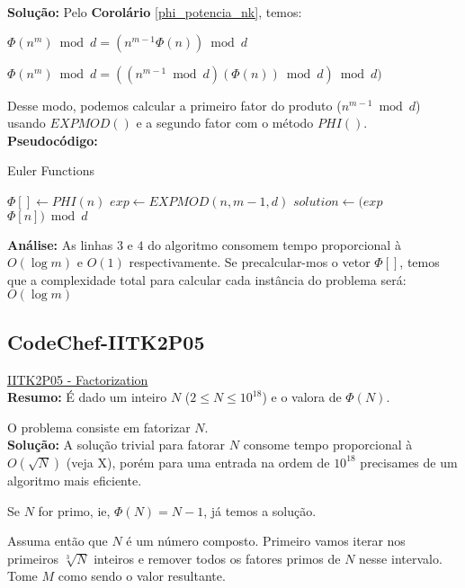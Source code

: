 \textbf{Solução:}
Pelo \textbf{Corolário} \autoref{phi_potencia_nk}, temos: 

$\Phi(n^m) \bmod d = (n^{m-1}\Phi(n)) \bmod d$

$\Phi(n^m) \bmod d = ((n^{m-1} \bmod d)(\Phi(n)) \bmod d) \bmod d)$

Desse modo, podemos calcular a primeiro fator do produto ($n^{m-1} \bmod d$) usando $EXPMOD()$ e a segundo fator com o método $PHI()$.
\\

\textbf{Pseudocódigo:}
\begin{algorithm}
\caption{Euler Functions}
\begin{algorithmic}[1]
\State $\Phi[] \gets PHI(n)$
\State $exp \gets EXPMOD(n, m-1, d)$
\State $solution \gets (exp$ $\Phi[n]) \bmod d$
\State {}
\EndProcedure
\end{algorithmic}
\end{algorithm}

\textbf{Análise:}
As linhas $3$ e $4$ do algoritmo consomem tempo proporcional à $O(\log m)$ e $O(1)$ respectivamente.
Se precalcular-mos o vetor $\Phi[]$, temos que a complexidade total para calcular cada instância do problema será: $O(\log m)$ 



\subsection{CodeChef-IITK2P05}
\href{https://www.codechef.com/problems/IITK2P05}{IITK2P05 - Factorization}\\

\textbf{Resumo:}
É dado um inteiro $N$ ($2 \leq N \leq 10^{18}$) e o valora de $\Phi(N)$.

O problema consiste em fatorizar $N$. 
\\

\textbf{Solução:}
A solução trivial para fatorar $N$ consome tempo proporcional à $O(\sqrt{N})$ (veja X), porém para uma entrada na ordem de $10^{18}$ precisames de um algoritmo mais eficiente.

Se $N$ for primo, ie, $\Phi(N) = N-1$, já temos a solução.

Assuma então que $N$ é um número composto. Primeiro vamos iterar nos primeiros $\sqrt[3]{N}$ inteiros e remover todos os fatores primos de $N$ nesse intervalo. Tome $M$ como sendo o valor resultante.

